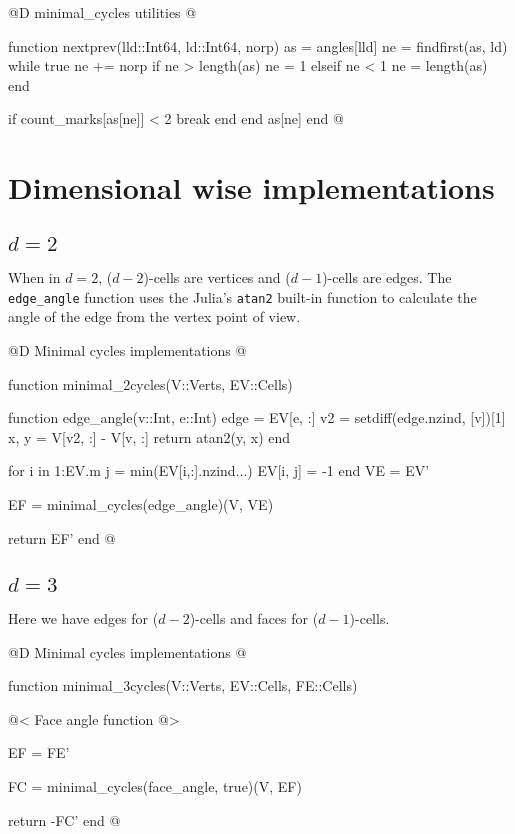 @D minimal\_cycles utilities
@{function nextprev(lld::Int64, ld::Int64, norp)
    as = angles[lld]
    ne = findfirst(as, ld)
    while true
        ne += norp
        if ne > length(as)
            ne = 1
        elseif ne < 1
            ne = length(as)
        end

        if count_marks[as[ne]] < 2
            break
        end
    end
    as[ne]
end
@}



\section{Dimensional wise implementations}
\label{sec:angles_fn}

\subsection{$d=2$}

When in $d=2$, ($d-2$)-cells are vertices and ($d-1$)-cells are edges.
The \texttt{edge\_angle} function uses the Julia's \texttt{atan2} 
built-in function to calculate the angle of the edge from the vertex point of view.

@D Minimal cycles implementations
@{function minimal_2cycles(V::Verts, EV::Cells)

    function edge_angle(v::Int, e::Int)
        edge = EV[e, :]
        v2 = setdiff(edge.nzind, [v])[1]
        x, y = V[v2, :] - V[v, :]
        return atan2(y, x)
    end

    for i in 1:EV.m
        j = min(EV[i,:].nzind...)
        EV[i, j] = -1
    end
    VE = EV'

    EF = minimal_cycles(edge_angle)(V, VE)

    return EF'
end
@}


\subsection{$d=3$}
\label{sec:3d_minimal_cycles}

Here we have edges for ($d-2$)-cells and faces for ($d-1$)-cells.

@D Minimal cycles implementations
@{function minimal_3cycles(V::Verts, EV::Cells, FE::Cells)

    @< Face angle function @>

    EF = FE'

    FC = minimal_cycles(face_angle, true)(V, EF)

    return -FC'
end
@}

